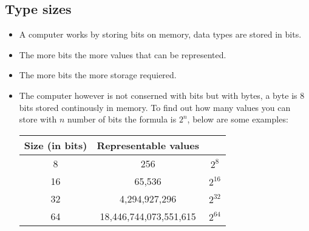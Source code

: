 \subsection{Type sizes}
\begin{itemize}
    \item A computer works by storing bits on memory, data types are stored in bits. 
    \item The more bits the more values that can be represented. 
    \item The more bits the more storage requiered.
    \item The computer however is not conserned with bits but with bytes, a byte is 8 bits stored continously in memory. To find out how many values you can store with $n$ number of bits the formula is $2^n$, below are some examples:  
        \begin{center}
            \begin{tabular}{ |c|c|c| }
                \hline
                    Size (in bits) & Representable values &  \\
                \hline
                    8 & 256 & $2^8$ \\ 
                    16 & 65,536 & $2^{16}$ \\ 
                    32 & 4,294,927,296 & $2^{32}$ \\ 
                    64 & 18,446,744,073,551,615 & $2^{64}$ \\ 
                \hline
            \end{tabular}
        \end{center}
\end{itemize}

